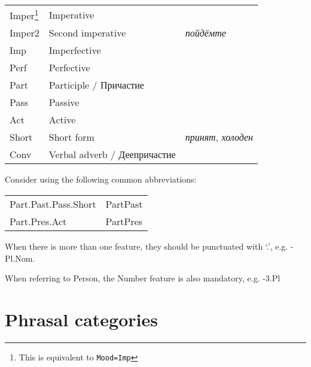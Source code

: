 \documentclass[a4paper,11pt, onecolumn,twoside]{article}
\begin{document}
\begin{tabular}{lll}
Imper\footnote{This is equivalent to \texttt{Mood=Imp}} & Imperative & ~ \\
Imper2 & Second imperative & \emph{пойдёмте} \\
Imp & Imperfective & ~ \\
Perf & Perfective & ~ \\
Part &  Participle / Причастие & ~   \\
Pass & Passive & ~ \\
Act & Active & ~ \\
Short & Short form & \emph{принят}, \emph{холоден} \\
Conv & Verbal adverb / Деепричастие & ~ \\
\end{tabular}

Consider using the following common abbreviations: 

\begin{tabular}{ll}
  Part.Past.Pass.Short & PartPast  \\
  Part.Pres.Act & PartPres \\
\end{tabular}

When there is more than one feature, they should be punctuated with `.', e.g. -Pl.Nom.

When referring to Person, the Number feature is also mandatory, e.g. -3.Pl

\section{Phrasal categories}
\end{document}
